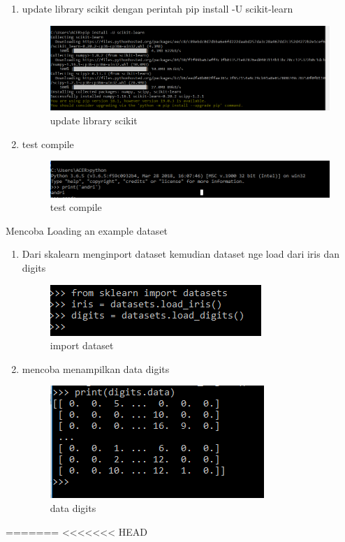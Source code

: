 \begin {enumerate}
\item update library scikit dengan perintah pip install -U scikit-learn
\par
\begin{figure}[ht]
\centering
\includegraphics[scale=0.5]{figures/333.png}
\caption{update library scikit}
\label{contoh3}
\end{figure}
\par

\item test compile
\par
\begin{figure}[ht]
\centering
\includegraphics[scale=0.5]{figures/444.png}
\caption{test compile}
\label{contoh4}
\end{figure}
\end {enumerate}
\par

Mencoba Loading an example dataset
\begin {enumerate}
\par
\item Dari skalearn menginport dataset kemudian dataset nge load dari iris dan digits
\par
\begin{figure}[ht]
\centering
\includegraphics[scale=0.5]{figures/555.png}
\caption{import dataset}
\label{contoh5}
\end{figure}
\par
\item mencoba menampilkan data digits
\par
\begin{figure}[ht]
\centering
\includegraphics[scale=0.5]{figures/666.png}
\caption{data digits}
\label{contoh6}
\end{figure}
\end {enumerate}
=======
<<<<<<< HEAD
